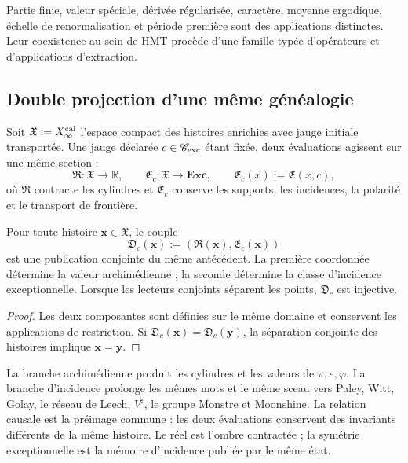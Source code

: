 Partie finie, valeur spéciale, dérivée régularisée, caractère, moyenne
ergodique, échelle de renormalisation et période première sont des applications distinctes. Leur
coexistence au sein de HMT procède d'une famille typée d'opérateurs et
d'applications d'extraction.

\subsection{Double projection d'une même généalogie}

Soit \(\mathfrak X:=X_\infty^{\rm cal}\) l'espace compact des histoires
enrichies avec jauge initiale transportée. Une jauge déclarée
\(c\in\mathscr C_{\rm exc}\) étant fixée, deux évaluations agissent sur une même section :
\[
 \mathfrak R:\mathfrak X\longrightarrow\mathbb R,
 \qquad
 \mathfrak E_c:\mathfrak X\longrightarrow\mathbf{Exc},
 \qquad
 \mathfrak E_c(x):=\mathfrak E(x,c),
\]
où \(\mathfrak R\) contracte les cylindres et \(\mathfrak E_c\) conserve les supports,
les incidences, la polarité et le transport de frontière.

\begin{theorem}
\label{p3-83-c44-s2:thm:unidad-causal-doble-proyeccion-numero}
Pour toute histoire \(\boldsymbol x\in\mathfrak X\), le couple
\[
 \mathfrak D_c(\boldsymbol x)
 :=(\mathfrak R(\boldsymbol x),\mathfrak E_c(\boldsymbol x))
\]
est une publication conjointe du même antécédent. La première coordonnée
détermine la valeur archimédienne ; la seconde détermine la classe d'incidence
exceptionnelle. Lorsque les lecteurs conjoints séparent les points,
\(\mathfrak D_c\) est injective.
\end{theorem}

\begin{proof}
Les deux composantes sont définies sur le même domaine et conservent les
applications de restriction. Si
\(\mathfrak D_c(\boldsymbol x)=\mathfrak D_c(\boldsymbol y)\), la séparation
conjointe des histoires implique \(\boldsymbol x=\boldsymbol y\).
\end{proof}

La branche archimédienne produit les cylindres et les valeurs de
\(\pi,e,\varphi\). La branche d'incidence prolonge les mêmes mots et le
même sceau vers Paley, Witt, Golay, le réseau de Leech,
\(V^\natural\), le groupe Monstre et Moonshine. La relation causale est la
préimage commune : les deux évaluations conservent des invariants différents de la
même histoire. Le réel est l'ombre contractée ; la symétrie exceptionnelle est la
mémoire d'incidence publiée par le même état.

